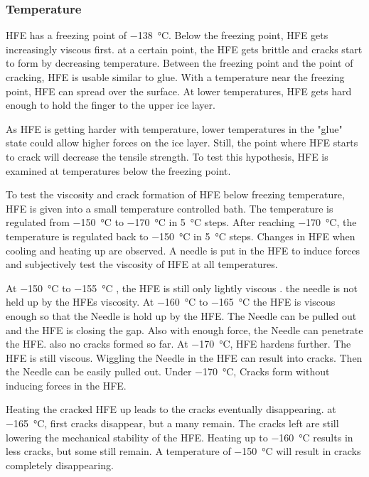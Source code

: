 \subsubsection{Temperature}

HFE has a freezing point of \SI{-138}{\degreeCelsius}. Below the freezing point, HFE gets increasingly viscous first. at a certain point, the HFE gets brittle and cracks start to form by decreasing temperature. Between the freezing point and the point of cracking, HFE is usable similar to glue. With a temperature near the freezing point, HFE can spread over the surface. At lower temperatures, HFE gets hard enough to hold the finger to the upper ice layer.

As HFE is getting harder with temperature, lower temperatures in the "glue" state could allow higher forces on the ice layer. Still, the point where HFE starts to crack will decrease the tensile strength. To test this hypothesis, HFE is examined at temperatures below the freezing point.

To test the viscosity and crack formation of HFE below freezing temperature, HFE is given into a small temperature controlled bath. The temperature is regulated from \SI{-150}{\degreeCelsius} to \SI{-170}{\degreeCelsius} in \SI{5}{\degreeCelsius} steps. After reaching \SI{-170}{\degreeCelsius}, the temperature is regulated back to \SI{-150}{\degreeCelsius} in \SI{5}{\degreeCelsius} steps. Changes in HFE when cooling and heating up are observed. A needle is put in the HFE to induce forces and subjectively test the viscosity of HFE at all temperatures.

At \SI{-150}{\degreeCelsius} to  \SI{-155}{\degreeCelsius} , the HFE is still only lightly viscous . the needle is not held up by the HFEs viscosity. At \SI{-160}{\degreeCelsius} to  \SI{-165}{\degreeCelsius} the HFE is viscous enough so that the Needle is hold up by the HFE. The Needle can be pulled out and the HFE is closing the gap. Also with enough force, the Needle can penetrate the HFE. also no cracks formed so far. At \SI{-170}{\degreeCelsius}, HFE hardens further. The HFE is still viscous. Wiggling the Needle in the HFE can result into cracks. Then the Needle can be easily pulled out. Under \SI{-170}{\degreeCelsius}, Cracks form without inducing forces in the HFE.

Heating the cracked HFE up leads to the cracks eventually disappearing. at \SI{-165}{\degreeCelsius}, first cracks disappear, but a many remain. The cracks left are still lowering the mechanical stability of the HFE. Heating up to \SI{-160}{\degreeCelsius} results in less cracks, but some still remain. A temperature of \SI{-150}{\degreeCelsius} will result in cracks completely disappearing.

